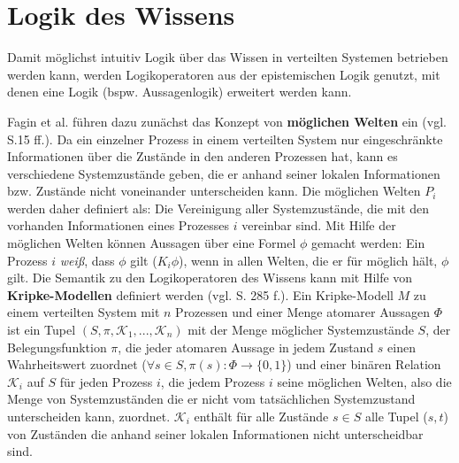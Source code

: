 \section{Logik des Wissens}
\label{Logik}
Damit möglichst intuitiv Logik über das Wissen in verteilten Systemen betrieben werden kann, werden Logikoperatoren aus der epistemischen Logik genutzt, mit denen eine Logik (bspw. Aussagenlogik) erweitert werden kann.

Fagin et al. führen dazu zunächst das Konzept von \textbf{möglichen Welten} ein (vgl. \cite{fagin2003reasoning} S.15 ff.). 
Da ein einzelner Prozess in einem verteilten System nur eingeschränkte Informationen über die Zustände in den anderen Prozessen hat, kann es verschiedene Systemzustände geben, die er anhand seiner lokalen Informationen bzw. Zustände nicht voneinander unterscheiden kann. Die möglichen Welten $P_i$ werden daher definiert als: Die Vereinigung aller Systemzustände, die mit den vorhanden Informationen eines Prozesses $i$ vereinbar sind.
Mit Hilfe der möglichen Welten können Aussagen über eine Formel $\phi$ gemacht werden:
Ein Prozess $i$ \textit{weiß}, dass $\phi$ gilt ($K_i\phi$), wenn in allen Welten, die er für möglich hält, $\phi$ gilt.
Die Semantik zu den Logikoperatoren des Wissens kann mit Hilfe von \textbf{Kripke-Modellen} definiert werden (vgl. \cite{kshemkalyani2011distributed} S. 285 f.).
Ein Kripke-Modell $M$ zu einem verteilten System mit $n$ Prozessen und einer Menge atomarer Aussagen $\Phi$ ist ein Tupel $(S,\pi,\mathcal{K}_1,...,\mathcal{K}_n)$ mit der Menge möglicher Systemzustände $S$, der Belegungsfunktion $\pi$, die jeder atomaren Aussage in jedem Zustand $s$ einen Wahrheitswert zuordnet ($\forall s\in S, \pi(s):\Phi \rightarrow \{0,1\}$) und einer binären Relation $\mathcal{K}_i$ auf $S$ für jeden Prozess $i$, die jedem Prozess $i$ seine möglichen Welten, also die Menge von Systemzuständen die er nicht vom tatsächlichen Systemzustand unterscheiden kann, zuordnet. $\mathcal{K}_i$ enthält für alle Zustände $s \in S$ alle Tupel ($s,t$) von Zuständen die anhand seiner lokalen Informationen nicht unterscheidbar sind. \medskip

